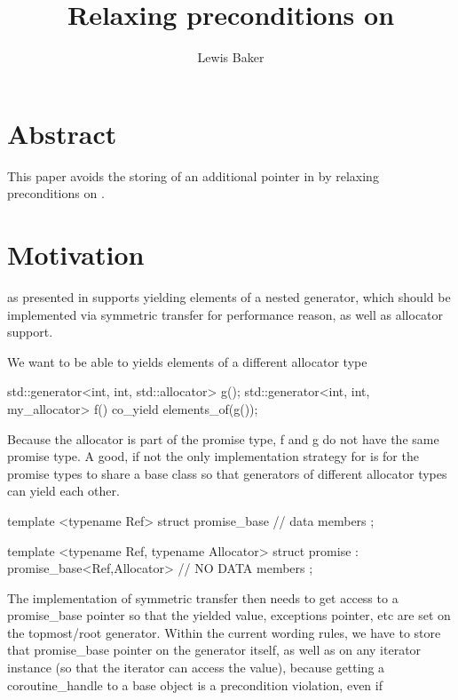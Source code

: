 \documentclass{wg21}
\title{Relaxing preconditions on \tcode{coroutine\_handle::from\_address}}
\author{Lewis Baker}{lewissbaker@gmail.com}
\begin{document}
\maketitle


\section{Abstract}
This paper avoids the storing of an additional pointer in  by relaxing preconditions on .


\section{Motivation}

 as presented in  supports yielding elements of a nested generator, which should be implemented via symmetric transfer for performance reason,
as well as allocator support.

We want to be able to yields elements of a different allocator type

\begin{colorblock}
    std::generator<int, int, std::allocator> g();
    std::generator<int, int, my_allocator> f() {
        co_yield elements_of(g());
    }
\end{colorblock}


Because the allocator is part of the promise type, f and g do not have the same promise type.
A good, if not the only implementation strategy for  is for the promise types to share a base class so that generators of different allocator types can yield each other.

\begin{colorblock}
template <typename Ref>
struct promise_base {
   // data members
};

template <typename Ref, typename Allocator>
struct promise : promise_base<Ref,Allocator> {
    // NO DATA members
};
\end{colorblock}

The implementation of symmetric transfer then needs to get access to a promise\_base pointer so that the yielded value, exceptions pointer, etc
are set on the topmost/root generator.
Within the current wording rules, we have to store that promise\_base pointer on the generator itself, as well as on any iterator instance (so that the iterator can access the value),
because getting a coroutine\_handle to a base object is a precondition violation, even if
\end{document}
